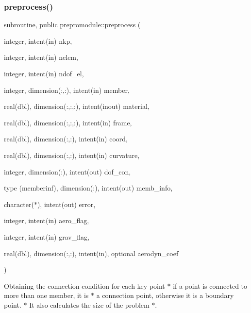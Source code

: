 \subsubsection{\texorpdfstring{preprocess()}{preprocess()}}
{\footnotesize\ttfamily subroutine, public prepromodule\+::preprocess (\begin{DoxyParamCaption}\item[{integer, intent(in)}]{nkp,  }\item[{integer, intent(in)}]{nelem,  }\item[{integer, intent(in)}]{ndof\+\_\+el,  }\item[{integer, dimension(\+:,\+:), intent(in)}]{member,  }\item[{real(dbl), dimension(\+:,\+:,\+:), intent(inout)}]{material,  }\item[{real(dbl), dimension(\+:,\+:,\+:), intent(in)}]{frame,  }\item[{real(dbl), dimension(\+:,\+:), intent(in)}]{coord,  }\item[{real(dbl), dimension(\+:,\+:), intent(in)}]{curvature,  }\item[{integer, dimension(\+:), intent(out)}]{dof\+\_\+con,  }\item[{type (memberinf), dimension(\+:), intent(out)}]{memb\+\_\+info,  }\item[{character($\ast$), intent(out)}]{error,  }\item[{integer, intent(in)}]{aero\+\_\+flag,  }\item[{integer, intent(in)}]{grav\+\_\+flag,  }\item[{real(dbl), dimension(\+:,\+:), intent(in), optional}]{aerodyn\+\_\+coef }\end{DoxyParamCaption})}



Obtaining the connection condition for each key point $\ast$ if a point is connected to more than one member, it is $\ast$ a connection point, otherwise it is a boundary point. $\ast$ It also calculates the size of the problem $\ast$. 


